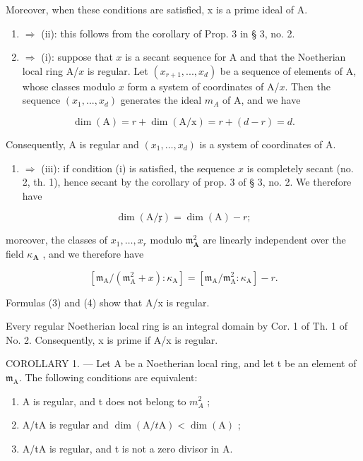 Moreover, when these conditions are satisfied, x is a prime ideal of A.

\begin{enumerate}
\def\labelenumi{(\roman{enumi})}
\setcounter{enumi}{2}
\item
  \(\Rightarrow\) (ii): this follows from the corollary of Prop. 3 in § 3, no. 2.
\item
  \(\Rightarrow\) (i): suppose that \(x\) is a secant sequence for A and that the Noetherian local ring A/\(x\) is regular. Let \((x_{r+1}, ..., x_d)\) be a sequence of elements of A, whose classes modulo \(x\) form a system of coordinates of A/\(x\). Then the sequence \((x_1, ..., x_d)\) generates the ideal \(m_A\) of A, and we have
\end{enumerate}

\[
\dim (\mathrm{A}) = r + \dim (\mathrm{A} / \mathrm{x}) = r + (d - r) = d.
\]

Consequently, A is regular and \((x_{1},\ldots,x_{d})\) is a system of coordinates of A.

\begin{enumerate}
\def\labelenumi{(\roman{enumi})}
\tightlist
\item
  \(\Rightarrow\) (iii): if condition (i) is satisfied, the sequence \(x\) is completely secant (no. 2, th. 1), hence secant by the corollary of prop. 3 of § 3, no. 2. We therefore have
\end{enumerate}

\[
\dim (\mathrm{A} / \mathfrak {x}) = \dim (\mathrm{A}) - r;\tag{3}
\]

moreover, the classes of \(x_{1},\ldots,x_{r}\) modulo \(\mathfrak{m}_{\mathbf{A}}^{2}\) are linearly independent over the field \(\kappa_{\mathbf{A}}\) , and we therefore have

\[
\left[ \mathfrak {m} _ {\mathrm{A}} / (\mathfrak {m} _ {\mathrm{A}} ^ {2} + x): \kappa_ {\mathrm{A}} \right] = \left[ \mathfrak {m} _ {\mathrm{A}} / \mathfrak {m} _ {\mathrm{A}} ^ {2}: \kappa_ {\mathrm{A}} \right] - r.\tag{4}
\]

Formulas (3) and (4) show that A/x is regular.

Every regular Noetherian local ring is an integral domain by Cor. 1 of Th. 1 of No. 2. Consequently, x is prime if A/x is regular.

COROLLARY 1. --- Let A be a Noetherian local ring, and let t be an element of \(\mathfrak{m}_{\mathrm{A}}\). The following conditions are equivalent:

\begin{enumerate}
\def\labelenumi{(\roman{enumi})}
\item
  A is regular, and t does not belong to \(m_{A}^{2}\) ;
\item
  A/tA is regular and \(\dim(\mathrm{A}/t\mathrm{A}) < \dim(\mathrm{A})\) ;
\item
  A/tA is regular, and t is not a zero divisor in A.
\end{enumerate}

